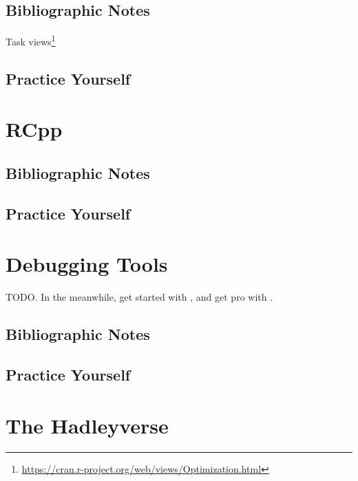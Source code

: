 \documentclass[]{book}
\renewcommand{\href}[2]{#2\footnote{\url{#1}}}
\theoremstyle{definition}
\theoremstyle{definition}
\theoremstyle{definition}
\theoremstyle{remark}
\begin{document}
\hypertarget{bibliographic-notes-16}{%
\section{Bibliographic Notes}\label{bibliographic-notes-16}}

\href{https://cran.r-project.org/web/views/Optimization.html}{Task views}

\hypertarget{practice-yourself-14}{%
\section{Practice Yourself}\label{practice-yourself-14}}

\hypertarget{rcpp}{%
\chapter{RCpp}\label{rcpp}}

\hypertarget{bibliographic-notes-17}{%
\section{Bibliographic Notes}\label{bibliographic-notes-17}}

\hypertarget{practice-yourself-15}{%
\section{Practice Yourself}\label{practice-yourself-15}}

\hypertarget{debugging}{%
\chapter{Debugging Tools}\label{debugging}}

TODO.
In the meanwhile, get started with \citet{wickham2011testthat}, and get pro with \citet{cotton2017testing}.

\hypertarget{bibliographic-notes-18}{%
\section{Bibliographic Notes}\label{bibliographic-notes-18}}

\hypertarget{practice-yourself-16}{%
\section{Practice Yourself}\label{practice-yourself-16}}

\hypertarget{hadley}{%
\chapter{The Hadleyverse}\label{hadley}}
\end{document}
